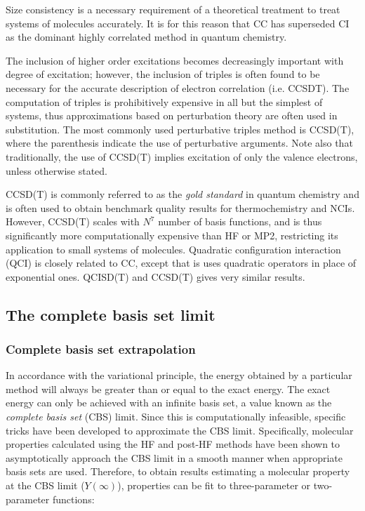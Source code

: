 \noindent Size consistency is a necessary requirement of a theoretical treatment to treat systems of molecules accurately. It is for this reason that CC has superseded CI as the dominant highly correlated method in quantum chemistry.

The inclusion of higher order excitations becomes decreasingly important with degree of excitation; however, the inclusion of triples is often found to be necessary for the accurate description of electron correlation (i.e. CCSDT). The computation of triples is prohibitively expensive in all but the simplest of systems, thus approximations based on perturbation theory are often used in substitution. The most commonly used perturbative triples method is CCSD(T), where the parenthesis indicate the use of perturbative arguments. Note also that traditionally, the use of CCSD(T) implies excitation of only the valence electrons, unless otherwise stated.

CCSD(T) is commonly referred to as the \emph{gold standard} in quantum chemistry and is often used to obtain benchmark quality results for thermochemistry and NCIs.\cite{Levine2013} However, CCSD(T) scales with $N^7$ number of basis functions, and is thus significantly more computationally expensive than HF or MP2, restricting its application to small systems of molecules. Quadratic configuration interaction (QCI) is closely related to CC, except that is uses quadratic operators in place of exponential ones. QCISD(T) and CCSD(T) gives very similar results.\cite{Pople1987}

\subsection{The complete basis set limit}

\subsubsection{Complete basis set extrapolation}

In accordance with the variational principle, the energy obtained by a particular method will always be greater than or equal to the exact energy. The exact energy can only be achieved with an infinite basis set, a value known as the \emph{complete basis set} (CBS) limit.\cite{Truhlar1998} Since this is computationally infeasible, specific tricks have been developed to approximate the CBS limit. Specifically, molecular properties calculated using the HF and post-HF methods have been shown to asymptotically approach the CBS limit in a smooth manner when appropriate basis sets are used. Therefore, to obtain results estimating a molecular property at the CBS limit ($Y(\infty)$), properties can be fit to three-parameter\cite{Feller1992,Feller1993} or two-parameter functions:\cite{Helgaker1997,Halkier1998}

